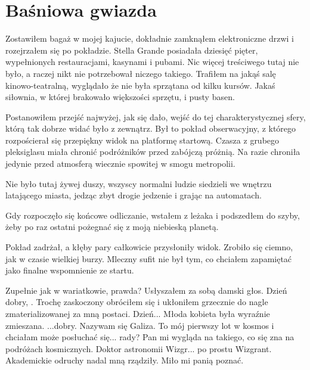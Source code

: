 \chapter{Baśniowa gwiazda} 


Zostawiłem bagaż w mojej kajucie, dokładnie zamknąłem elektroniczne drzwi i rozejrzałem się po pokładzie.
Stella Grande posiadała dziesięć pięter, wypełnionych restauracjami, kasynami i pubami.
Nic więcej treściwego tutaj nie było, a raczej nikt nie potrzebował niczego takiego.
Trafiłem na jakąś salę kinowo-teatralną, wyglądało że nie była sprzątana od kilku kursów.
Jakaś siłownia, w której brakowało większości sprzętu, i pusty basen.

Postanowiłem przejść najwyżej, jak się dało, wejść do tej charakterystycznej sfery, którą tak dobrze widać było z zewnątrz.
Był to pokład obserwacyjny, z którego rozpościerał się przepiękny widok na platformę startową.
Czasza z grubego pleksiglasu miała chronić podróżników przed zabójczą próżnią.
Na razie chroniła jedynie przed atmosferą wiecznie spowitej w smogu metropolii.

Nie było tutaj żywej duszy, wszyscy normalni ludzie siedzieli we wnętrzu latającego miasta, jedząc zbyt drogie jedzenie i grając na automatach.

Gdy rozpoczęło się końcowe odliczanie, wstałem z leżaka i podszedłem do szyby, żeby po raz ostatni pożegnać się z moją niebieską planetą.

Pokład zadrżał, a kłęby pary całkowicie przysłoniły widok.
Zrobiło się ciemno, jak w czasie wielkiej burzy.
Mleczny sufit nie był tym, co chciałem zapamiętać jako finalne wspomnienie ze startu.

\begin{dialogue}
	\ds{} Zupełnie jak w wariatkowie, prawda? \dm{} Usłyszałem za sobą damski głos.
	\ds{} Dzień dobry, . \dm{} Trochę zaskoczony obróciłem się i ukłoniłem grzecznie do nagle zmaterializowanej za mną postaci.
	\ds{} Dzień... \dm{} Młoda kobieta była wyraźnie zmieszana. \dm{} ...dobry. Nazywam się Galiza. To mój pierwszy lot w kosmos i chciałam może posłuchać się... rady?
		Pan mi wygląda na takiego, co się zna na podróżach kosmicznych.
	\ds{} Doktor astronomii Wizgr... po prostu Wizgrant. \dm{} Akademickie odruchy nadal mną rządziły. \dm{} Miło mi panią poznać.
\end{dialogue}

